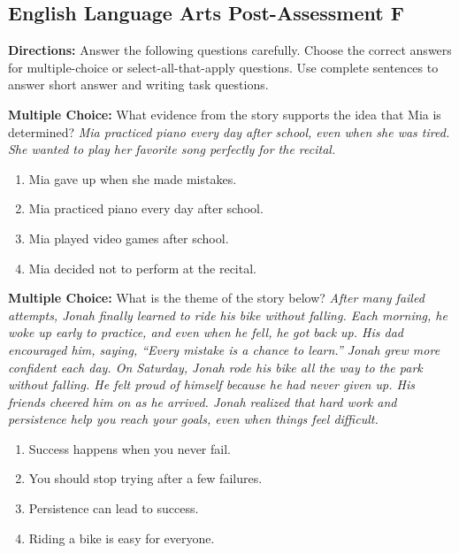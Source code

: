 \documentclass[12pt]{article}
\begin{document}
\subsection*{English Language Arts Post-Assessment F}
\onehalfspacing

\begin{tcolorbox}[colframe=black!50, colback=white, title=Assessment Directions]
\textbf{Directions:} Answer the following questions carefully. Choose the correct answers for multiple-choice or select-all-that-apply questions. Use complete sentences to answer short answer and writing task questions.
\end{tcolorbox}

\begin{tcolorbox}[colframe=black!50, colback=white, title=Question 1]
\textbf{Multiple Choice:} What evidence from the story supports the idea that Mia is determined?  
\textit{Mia practiced piano every day after school, even when she was tired. She wanted to play her favorite song perfectly for the recital.}  
\begin{enumerate}[label=(\Alph*)]
\item Mia gave up when she made mistakes.  
\item Mia practiced piano every day after school.  
\item Mia played video games after school.  
\item Mia decided not to perform at the recital.  
\end{enumerate}
\end{tcolorbox}

\begin{tcolorbox}[colframe=black!50, colback=white, title=Question 2]
\textbf{Multiple Choice:} What is the theme of the story below?  
\textit{After many failed attempts, Jonah finally learned to ride his bike without falling. Each morning, he woke up early to practice, and even when he fell, he got back up. His dad encouraged him, saying, “Every mistake is a chance to learn.” Jonah grew more confident each day. On Saturday, Jonah rode his bike all the way to the park without falling. He felt proud of himself because he had never given up. His friends cheered him on as he arrived. Jonah realized that hard work and persistence help you reach your goals, even when things feel difficult.}

\begin{enumerate}[label=(\Alph*)]
\item Success happens when you never fail.  
\item You should stop trying after a few failures.  
\item Persistence can lead to success.  
\item Riding a bike is easy for everyone.  
\end{enumerate}
\end{tcolorbox}
\end{document}
